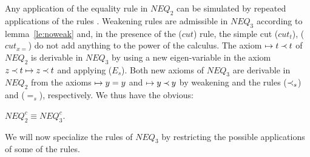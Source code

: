 \noindent
Any application of the equality rule  in $NEQ_2$ can be simulated
by repeated applications of the rules . %
Weakening rules are admissible in $NEQ_3$ according to lemma~\ref{le:noweak} and, in
the presence of the ($cut$) rule, the simple cut ($cut_t$), ($cut_{x=}$) 
do not add anything to the
power of the calculus. The axiom $\mathrel{\mapsto} t\mathbin{\prec} t$ of $NEQ_2$ is derivable in $NEQ_3$
by using a new eigen-variable in the axiom $z\mathbin{\prec} t\mathrel{\mapsto} z\mathbin{\prec} t$ and applying ($E_s$).
Both new axioms of $NEQ_3$ are derivable in $NEQ_2$ from the axioms $\mathrel{\mapsto} y=y$ and
$\mathrel{\mapsto} y\mathbin{\prec} y$ by weakening and the rules ($\mathbin{\prec}_s$) and ($=_s$), respectively.
We thus have the obvious:
\begin{LEMMA}\label{le:neq2isneq3}
 $NEQ_2^c \equiv NEQ_3^c$.
\end{LEMMA}
%
\noindent
We will now specialize the rules of $NEQ_3$ by restricting the possible
applications of some of the rules.
%
